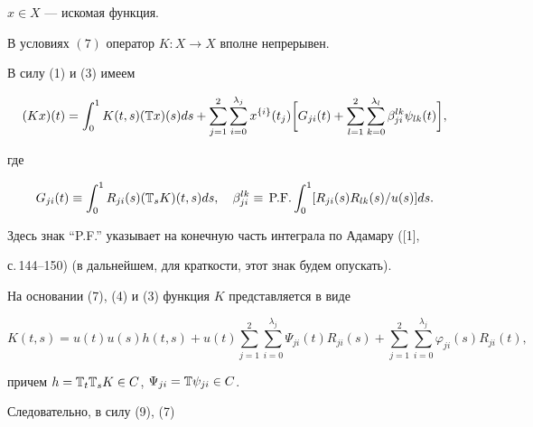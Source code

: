 $x\in X$ --- искомая функция. 


 


\begin{thm} 


В условиях $(7)$ оператор $K:X\to X$ вполне непрерывен. 


\end{thm} 


 


\begin{pf} 


В силу (1) и (3) имеем 


\begin{equation} 


(K x)(t)=\int^1_0 K(t,s)(\Bbb T x)(s)ds+\sum^2_{j=1} 


\sum^{\lambda_j}_{i=0}x^{\{i\}}(t_j)\bigg[G_{j i}(t)+ 


\sum^2_{l=1}\sum^{\lambda_l}_{k=0}\beta^{l k}_{j i} 


\psi_{l k}(t)\bigg], 


\end{equation} 


где 


$$ 


G_{j i}(t)\equiv\int^1_0 R_{j i}(s)(\Bbb T_s K)(t,s)ds,\quad 


\beta^{l k}_{j i}\equiv\,\text{P.F.}\int^1_0 


[R_{j i}(s)R_{l k}(s)/u(s)]ds. 


$$ 


Здесь знак ``P.F.'' указывает на конечную часть интеграла по Адамару ([1], 


с.\,144--150) (в дальнейшем, для краткости, этот знак будем опускать). 


На основании (7), (4) и (3) функция $K$ представляется в виде 


\begin{equation} 


K(t,s)=u(t)u(s)h(t,s)+u(t)\sum^2_{j=1}\sum^{\lambda_j}_{i=0} 


\Psi_{j i}(t)R_{j i}(s)+\sum^2_{j=1}\sum^{\lambda_j}_{i=0} 


\varphi_{j i}(s)R_{j i}(t), 


\end{equation} 


причем $h=\Bbb T_t\Bbb T_s K\in C$, $\Psi_{j i}=\Bbb T\psi_{j i}\in C$. 


Следовательно, в силу (9), (7) 



\end{pf}

